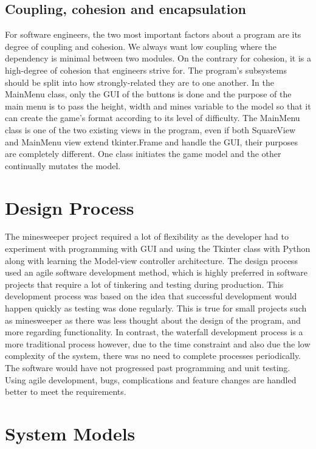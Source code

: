 \documentclass[12pt, a4]{report}
\begin{document}
	\subsection{Coupling, cohesion and encapsulation}
	\par For software engineers, the two most important factors about a program are its degree of coupling and cohesion. We always want low coupling where the dependency is minimal
	between two modules. On the contrary for cohesion, it is a high-degree of cohesion that engineers strive for. The program's subsystems should be split into how strongly-related they are to one another.
	In the MainMenu class, only the GUI of the buttons is done and the purpose of the main menu is to pass the height, width and mines variable to the model so that it can create the
	game's format according to its level of difficulty. The MainMenu class is one of the two existing views in the program, even if both SquareView and MainMenu view extend tkinter.Frame
	and handle the GUI, their purposes are completely different. One class initiates the game model and the other continually mutates the model.
	
	\section{Design Process}
	\par
	The minesweeper project required a lot of flexibility as the developer had to experiment with programming with GUI and using the Tkinter class with Python along with 
	learning the Model-view controller architecture. The design process used an agile software development method, which is highly preferred in software projects that require
	a lot of tinkering and testing during production. This development process was based on the idea that successful development would happen quickly as testing was done regularly.
	This is true for small projects such as minesweeper as there was less thought about the design of the program, and more regarding functionality. 
	In contrast, the waterfall development process is a more traditional process however, due to the time constraint and also due the low complexity of the system, there was 
	no need to complete processes periodically. The software would have not progressed past programming and unit testing. Using agile development, bugs, 
	complications and feature changes are handled better to meet the requirements.
	
	\section{System Models}
\end{document}
